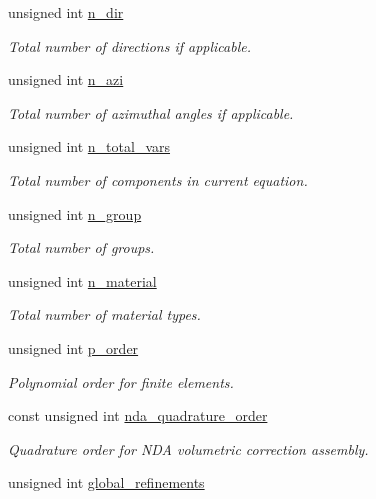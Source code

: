 \begin{DoxyCompactItemize}
unsigned int \hyperlink{class_equation_base_a7f01312245816bc60e1cf0a1630030a2}{n\+\_\+dir}
\begin{DoxyCompactList}\small\item\em Total number of directions if applicable. \end{DoxyCompactList}\item 
unsigned int \hyperlink{class_equation_base_a006861508fc71350aee8274fd949b1e6}{n\+\_\+azi}
\begin{DoxyCompactList}\small\item\em Total number of azimuthal angles if applicable. \end{DoxyCompactList}\item 
unsigned int \hyperlink{class_equation_base_a505c44d58215a614d263615a53159fda}{n\+\_\+total\+\_\+vars}
\begin{DoxyCompactList}\small\item\em Total number of components in current equation. \end{DoxyCompactList}\item 
unsigned int \hyperlink{class_equation_base_adf5fc09a70820108fd273b0e2183db55}{n\+\_\+group}
\begin{DoxyCompactList}\small\item\em Total number of groups. \end{DoxyCompactList}\item 
unsigned int \hyperlink{class_equation_base_a6eba5e7408331bce23945068cba4ed19}{n\+\_\+material}
\begin{DoxyCompactList}\small\item\em Total number of material types. \end{DoxyCompactList}\item 
unsigned int \hyperlink{class_equation_base_a0facd1cc5977e32b301a134ed5b9fa98}{p\+\_\+order}
\begin{DoxyCompactList}\small\item\em Polynomial order for finite elements. \end{DoxyCompactList}\item 
const unsigned int \hyperlink{class_equation_base_aafed438df52a6a2adca972fad322dd7b}{nda\+\_\+quadrature\+\_\+order}
\begin{DoxyCompactList}\small\item\em Quadrature order for N\+DA volumetric correction assembly. \end{DoxyCompactList}\item 
unsigned int \hyperlink{class_equation_base_a9433f3e6cb2251b0b7d0408570677b2e}{global\+\_\+refinements}

\end{DoxyCompactItemize}
